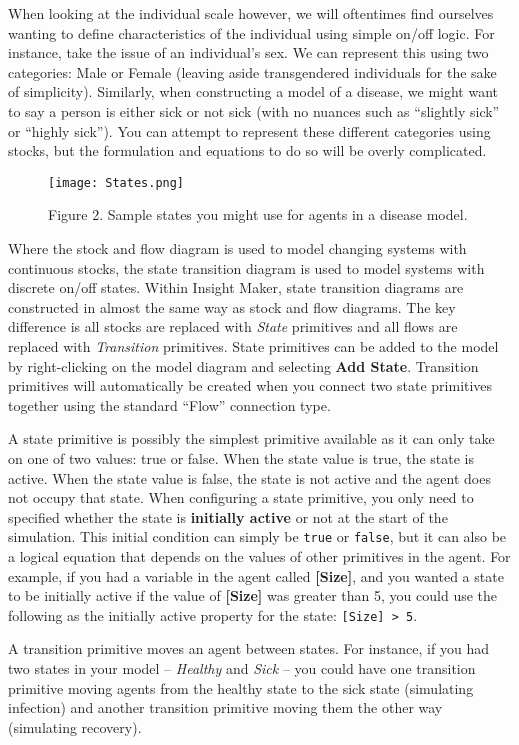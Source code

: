 \documentclass[]{memoir}
\let\Oldincludegraphics\includegraphics
\renewcommand{\includegraphics}[1]{\Oldincludegraphics[max size={\textwidth}{\textheight}]{#1}}
\newcommand{\p}[1]{\textbf{{[}#1{]}}}
\renewcommand{\u}[1]{\textbf{#1}}
\renewcommand{\a}[1]{\textbf{#1}}
\begin{document}
When looking at the individual scale however, we will oftentimes find
ourselves wanting to define characteristics of the individual using
simple on/off logic. For instance, take the issue of an individual's
sex. We can represent this using two categories: Male or Female (leaving
aside transgendered individuals for the sake of simplicity). Similarly,
when constructing a model of a disease, we might want to say a person is
either sick or not sick (with no nuances such as ``slightly sick'' or
``highly sick''). You can attempt to represent these different
categories using stocks, but the formulation and equations to do so will
be overly complicated.

\begin{figure}[htbp]
\centering
\texttt{[image: States.png]}
\caption{Figure 2. Sample states you might use for agents in a disease
model.}
\end{figure}

Where the stock and flow diagram is used to model changing systems with
continuous stocks, the state transition diagram is used to model systems
with discrete on/off states. Within Insight Maker, state transition
diagrams are constructed in almost the same way as stock and flow
diagrams. The key difference is all stocks are replaced with
\emph{State} primitives and all flows are replaced with
\emph{Transition} primitives. State primitives can be added to the model
by right-clicking on the model diagram and selecting \u{Add State}.
Transition primitives will automatically be created when you connect two
state primitives together using the standard ``Flow'' connection type.

A state primitive is possibly the simplest primitive available as it can
only take on one of two values: true or false. When the state value is
true, the state is active. When the state value is false, the state is
not active and the agent does not occupy that state. When configuring a
state primitive, you only need to specified whether the state is
\a{initially active} or not at the start of the simulation. This initial
condition can simply be \lstinline!true! or \lstinline!false!, but it
can also be a logical equation that depends on the values of other
primitives in the agent. For example, if you had a variable in the agent
called \p{Size}, and you wanted a state to be initially active if the
value of \p{Size} was greater than 5, you could use the following as the
initially active property for the state: \lstinline![Size] > 5!.

A transition primitive moves an agent between states. For instance, if
you had two states in your model -- \emph{Healthy} and \emph{Sick} --
you could have one transition primitive moving agents from the healthy
state to the sick state (simulating infection) and another transition
primitive moving them the other way (simulating recovery).
\end{document}
